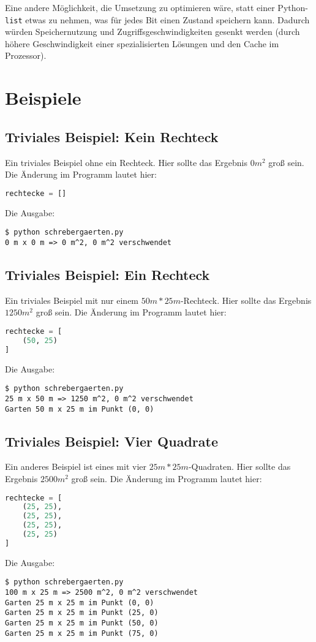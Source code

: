 \documentclass[a4paper,10pt,ngerman]{scrartcl}
\begin{document}
Eine andere Möglichkeit, die Umsetzung zu optimieren wäre, statt einer Python-\texttt{list} etwas zu nehmen, was für jedes Bit einen Zustand speichern kann. Dadurch würden Speichernutzung und Zugriffsgeschwindigkeiten gesenkt werden (durch höhere Geschwindigkeit einer spezialisierten Lösungen und den Cache im Prozessor).

\section{Beispiele}


\subsection{Triviales Beispiel: Kein Rechteck}
Ein triviales Beispiel ohne ein Rechteck. Hier sollte das Ergebnis $0m^2$ groß sein. Die Änderung im Programm lautet hier:
\begin{lstlisting}[language=Python]
rechtecke = []
\end{lstlisting}
Die Ausgabe:
\begin{lstlisting}
$ python schrebergaerten.py
0 m x 0 m => 0 m^2, 0 m^2 verschwendet
\end{lstlisting}

\subsection{Triviales Beispiel: Ein Rechteck}
Ein triviales Beispiel mit nur einem $50m*25m$-Rechteck. Hier sollte das Ergebnis $1250m^2$ groß sein. Die Änderung im Programm lautet hier:
\begin{lstlisting}[language=Python]
rechtecke = [
    (50, 25)
]
\end{lstlisting}
Die Ausgabe:
\begin{lstlisting}
$ python schrebergaerten.py
25 m x 50 m => 1250 m^2, 0 m^2 verschwendet
Garten 50 m x 25 m im Punkt (0, 0)
\end{lstlisting}


\subsection{Triviales Beispiel: Vier Quadrate} 
Ein anderes Beispiel ist eines mit vier $25m*25m$-Quadraten. Hier sollte das Ergebnis $2500m^2$ groß sein. Die Änderung im Programm lautet hier:
\begin{lstlisting}[language=Python]
rechtecke = [
    (25, 25),
    (25, 25),
    (25, 25),
    (25, 25)
]
\end{lstlisting}
Die Ausgabe:
\begin{lstlisting}
$ python schrebergaerten.py
100 m x 25 m => 2500 m^2, 0 m^2 verschwendet
Garten 25 m x 25 m im Punkt (0, 0)
Garten 25 m x 25 m im Punkt (25, 0)
Garten 25 m x 25 m im Punkt (50, 0)
Garten 25 m x 25 m im Punkt (75, 0)
\end{lstlisting}
\end{document}
